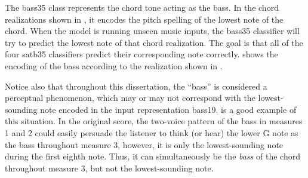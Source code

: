 
The \gls{bass35} class represents the chord tone acting as
the bass. In the chord realizations shown in
, it encodes the pitch spelling of the
lowest note of the chord. When the model is running unseen
music inputs, the \gls{bass35} classifier will try to
predict the lowest note of that chord realization. The goal
is that all of the four \gls{satb35} classifiers predict
their corresponding note correctly.  shows
the encoding of the bass according to the realization shown
in .

Notice also that throughout this dissertation, the ``bass''
is considered a perceptual phenomenon, which may or may not
correspond with the lowest-sounding note encoded in the
input representation \gls{bass19}.  is
a good example of this situation. In the original score, the
two-voice pattern of the bass in measures 1 and 2 could
easily persuade the listener to think (or hear) the lower G
note as the bass throughout measure 3, however, it is only
the lowest-sounding note during the first eighth note. Thus,
it can simultaneously be the \emph{bass} of the chord
throughout measure 3, but not the lowest-sounding note.




